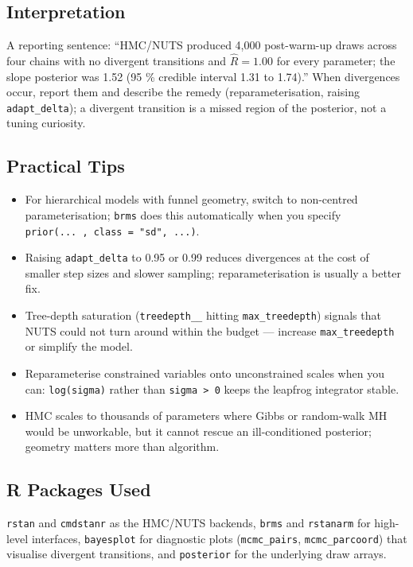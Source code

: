 \documentclass[
]{article}
\providecommand{\tightlist}{%
  \setlength{\itemsep}{0pt}\setlength{\parskip}{0pt}}
\begin{document}
\subsection{Interpretation}\label{interpretation}

A reporting sentence: ``HMC/NUTS produced 4,000 post-warm-up draws
across four chains with no divergent transitions and \(\hat R = 1.00\)
for every parameter; the slope posterior was 1.52 (95 \% credible
interval 1.31 to 1.74).'' When divergences occur, report them and
describe the remedy (reparameterisation, raising \texttt{adapt\_delta});
a divergent transition is a missed region of the posterior, not a tuning
curiosity.

\subsection{Practical Tips}\label{practical-tips}

\begin{itemize}
\tightlist
\item
  For hierarchical models with funnel geometry, switch to non-centred
  parameterisation; \texttt{brms} does this automatically when you
  specify \texttt{prior(...\ ,\ class\ =\ "sd",\ ...)}.
\item
  Raising \texttt{adapt\_delta} to 0.95 or 0.99 reduces divergences at
  the cost of smaller step sizes and slower sampling; reparameterisation
  is usually a better fix.
\item
  Tree-depth saturation (\texttt{treedepth\_\_} hitting
  \texttt{max\_treedepth}) signals that NUTS could not turn around
  within the budget --- increase \texttt{max\_treedepth} or simplify the
  model.
\item
  Reparameterise constrained variables onto unconstrained scales when
  you can: \texttt{log(sigma)} rather than
  \texttt{sigma\ \textgreater{}\ 0} keeps the leapfrog integrator
  stable.
\item
  HMC scales to thousands of parameters where Gibbs or random-walk MH
  would be unworkable, but it cannot rescue an ill-conditioned
  posterior; geometry matters more than algorithm.
\end{itemize}

\subsection{R Packages Used}\label{r-packages-used}

\texttt{rstan} and \texttt{cmdstanr} as the HMC/NUTS backends,
\texttt{brms} and \texttt{rstanarm} for high-level interfaces,
\texttt{bayesplot} for diagnostic plots (\texttt{mcmc\_pairs},
\texttt{mcmc\_parcoord}) that visualise divergent transitions, and
\texttt{posterior} for the underlying draw arrays.
\end{document}
